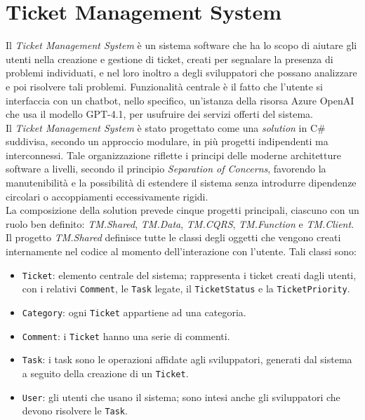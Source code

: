 \chapter{Ticket Management System}

Il \textit{Ticket Management System} è un sistema software che ha lo scopo di aiutare gli utenti nella creazione e gestione di ticket, 
creati per segnalare la presenza di problemi individuati, e nel loro inoltro a degli sviluppatori che possano analizzare e poi risolvere 
tali problemi. Funzionalità centrale è il fatto che l'utente si interfaccia con un chatbot, nello specifico, un'istanza della risorsa 
Azure OpenAI che usa il modello GPT-4.1, per usufruire dei servizi offerti del sistema.
\\
Il \textit{Ticket Management System} è stato progettato come una \textit{solution} in C\# suddivisa, secondo un approccio modulare,
in più progetti indipendenti ma interconnessi. Tale organizzazione riflette i principi delle moderne architetture software a livelli, 
secondo il principio \textit{Separation of Concerns}, favorendo la manutenibilità e la possibilità di estendere il sistema
senza introdurre dipendenze circolari o accoppiamenti eccessivamente rigidi.
\\
La composizione della solution prevede cinque progetti principali, ciascuno con un ruolo ben definito: \textit{TM.Shared}, \textit{TM.Data},
\textit{TM.CQRS}, \textit{TM.Function} e \textit{TM.Client}.
\\
Il progetto \textit{TM.Shared} definisce tutte le classi degli oggetti che vengono creati internamente nel codice al momento dell'interazione 
con l'utente. Tali classi sono:
\begin{itemize}
    \item \texttt{Ticket}: elemento centrale del sistema; rappresenta i ticket creati dagli utenti, con i relativi \texttt{Comment}, 
        le \texttt{Task} legate, il \texttt{TicketStatus} e la \texttt{TicketPriority}.
    \item \texttt{Category}: ogni \texttt{Ticket} appartiene ad una categoria.
    \item \texttt{Comment}: i \texttt{Ticket} hanno una serie di commenti.
    \item \texttt{Task}: i task sono le operazioni affidate agli sviluppatori, generati dal sistema a seguito della creazione 
        di un \texttt{Ticket}. 
    \item \texttt{User}: gli utenti che usano il sistema; sono intesi anche gli sviluppatori che devono risolvere le \texttt{Task}.
\end{itemize}

